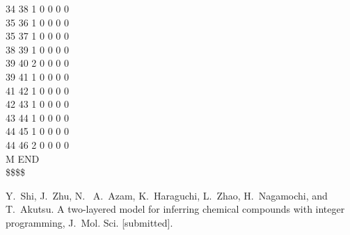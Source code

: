\documentclass[11pt,titlepage,dvipdfmx,twoside]{jarticle}
\begin{document}
\begin{oframed}
{ 34 38  1  0  0  0  0                                                      \\
 35 36  1  0  0  0  0                                                      \\
 35 37  1  0  0  0  0                                                      \\
 38 39  1  0  0  0  0                                                      \\
 39 40  2  0  0  0  0                                                      \\
 39 41  1  0  0  0  0                                                      \\
 41 42  1  0  0  0  0                                                      \\
 42 43  1  0  0  0  0                                                      \\
 43 44  1  0  0  0  0                                                      \\
 44 45  1  0  0  0  0                                                      \\
 44 46  2  0  0  0  0                                                      \\
M  END                                                                     \\
\$\$\$\$                                                                                                                                                 \\
}
\end{oframed}
\begin{thebibliography}{10}
	  Y.~Shi, J.~Zhu, N.~ A.~Azam, K.~Haraguchi, 
	  L.~Zhao, H.~Nagamochi, and T.~Akutsu. 
	  A two-layered model for inferring chemical
compounds with integer programming, 
	  J.~Mol. Sci. [submitted]. 
\end{thebibliography}
\end{document}
